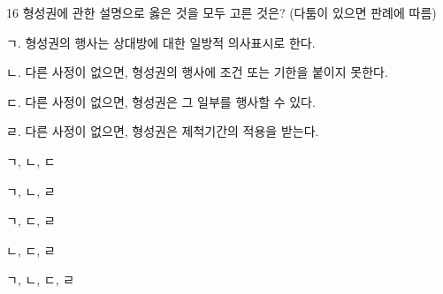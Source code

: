 \begin{question}{16}
형성권에 관한 설명으로 옳은 것을 모두 고른 것은? (다툼이 있으면 판례에 따름)
\begin{framedtext}
ㄱ. 형성권의 행사는 상대방에 대한 일방적 의사표시로 한다. \par
ㄴ. 다른 사정이 없으면, 형성권의 행사에 조건 또는 기한을 붙이지 못한다. \par
ㄷ. 다른 사정이 없으면, 형성권은 그 일부를 행사할 수 있다. \par
ㄹ. 다른 사정이 없으면, 형성권은 제척기간의 적용을 받는다. \par
\end{framedtext}
\begin{choices}
  \item ㄱ, ㄴ, ㄷ
  \item ㄱ, ㄴ, ㄹ
  \item ㄱ, ㄷ, ㄹ
  \item ㄴ, ㄷ, ㄹ
  \item ㄱ, ㄴ, ㄷ, ㄹ
\end{choices}
\end{question}
